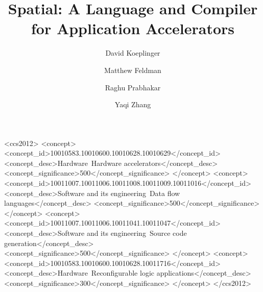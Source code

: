\documentclass[sigplan,screen]{acmart}
\begin{document}
\begin{CCSXML}
<ccs2012>
<concept>
<concept_id>10010583.10010600.10010628.10010629</concept_id>
<concept_desc>Hardware~Hardware accelerators</concept_desc>
<concept_significance>500</concept_significance>
</concept>
<concept>
<concept_id>10011007.10011006.10011008.10011009.10011016</concept_id>
<concept_desc>Software and its engineering~Data flow languages</concept_desc>
<concept_significance>500</concept_significance>
</concept>
<concept>
<concept_id>10011007.10011006.10011041.10011047</concept_id>
<concept_desc>Software and its engineering~Source code generation</concept_desc>
<concept_significance>500</concept_significance>
</concept>
<concept>
<concept_id>10010583.10010600.10010628.10011716</concept_id>
<concept_desc>Hardware~Reconfigurable logic applications</concept_desc>
<concept_significance>300</concept_significance>
</concept>
</ccs2012>
\end{CCSXML}






\title{Spatial: A Language and Compiler for Application Accelerators}

\author{David Koeplinger}

\author{Matthew Feldman}

\author{Raghu Prabhakar}

\author{Yaqi Zhang}
\end{document}
